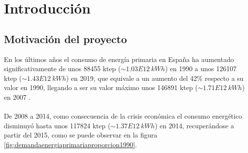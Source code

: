 \chapter{Introducción}


\section{Motivación del proyecto}

En los últimos años el consumo de energía primaria en España ha aumentado significativamente de unos 88455 ktep ($\sim1.03E12 \ kWh$) en 1990 a unos 126107 ktep ($\sim 1.43E12 \ kWh$) en 2019, que equivale a un aumento del 42\% respecto a su valor en 1990, llegando a ser su valor máximo unos 146891 ktep ($\sim 1.71E12 \ kWh$) en 2007 \cite{libroEnergiaEnEspana2019}.\\\\
De 2008 a 2014, como consecuencia de la crisis económica el consumo energético disminuyó hasta unos 117824 ktep ($\sim 1.37E12 \ kWh$) en 2014, recuperándose a partir del 2015, como se puede observar en la figura \ref{fig:demandaenergiaprimariaproporcion1990}. \\


